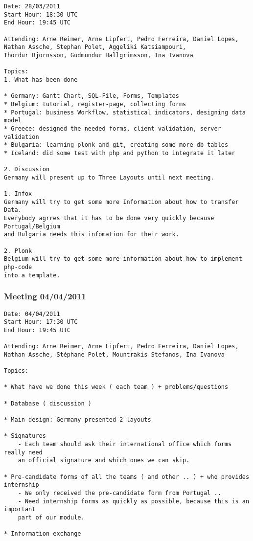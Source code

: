 \begin{verbatim}
Date: 28/03/2011
Start Hour: 18:30 UTC
End Hour: 19:45 UTC

Attending: Arne Reimer, Arne Lipfert, Pedro Ferreira, Daniel Lopes,
Nathan Assche, Stephan Polet, Aggeliki Katsiampouri,
Thordur Bjornsson, Gudmundur Hallgrimsson, Ina Ivanova

Topics:
1. What has been done

* Germany: Gantt Chart, SQL-File, Forms, Templates
* Belgium: tutorial, register-page, collecting forms
* Portugal: business Workflow, statistical indicators, designing data model
* Greece: designed the needed forms, client validation, server validation
* Bulgaria: learning plonk and git, creating some more db-tables
* Iceland: did some test with php and python to integrate it later

2. Discussion
Germany will present up to Three Layouts until next meeting.

1. Infox
Germany will try to get some more Information about how to transfer Data.
Everybody agrres that it has to be done very quickly because Portugal/Belgium
and Bulgaria needs this infomation for their work.

2. Plonk
Belgium will try to get some more information about how to implement php-code
into a template.
\end{verbatim}

\subsubsection{Meeting 04/04/2011}

\begin{verbatim}
Date: 04/04/2011
Start Hour: 17:30 UTC
End Hour: 19:45 UTC

Attending: Arne Reimer, Arne Lipfert, Pedro Ferreira, Daniel Lopes,
Nathan Assche, Stéphane Polet, Mountrakis Stefanos, Ina Ivanova

Topics:

* What have we done this week ( each team ) + problems/questions
	
* Database ( discussion )

* Main design: Germany presented 2 layouts

* Signatures 
	- Each team should ask their international office which forms really need 
	an official signature and which ones we can skip.

* Pre-candidate forms of all the teams ( and other .. ) + who provides
internship
    - We only received the pre-candidate form from Portugal ..
	- Need internship forms as quickly as possible, because this is an important
	part of our module.

* Information exchange
\end{verbatim}

